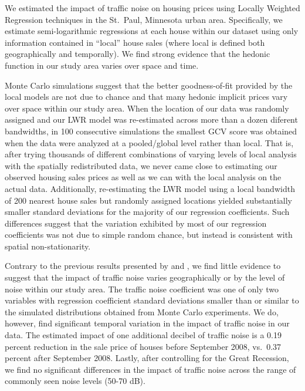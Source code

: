 \documentclass{article}\usepackage{graphicx, color}
\begin{document}
We estimated the impact of traffic noise on housing prices using Locally Weighted Regression techniques in the St.\ Paul, Minnesota urban area. Specifically, we estimate semi-logarithmic regressions at each house within our dataset using only information contained in ``local'' house sales (where local is defined both geographically and temporally). We find strong evidence that the hedonic function in our study area varies over space and time. 

Monte Carlo simulations suggest that the better goodness-of-fit provided by the local models are not due to chance and that many hedonic implicit prices vary over space within our study area. When the location of our data was randomly assigned and our LWR model was re-estimated across more than a dozen diferent bandwidths, in 100 consecutive simulations the smallest GCV score was obtained when the data were analyzed at a pooled/global level rather than local. That is, after trying thousands of different combinations of varying levels of local analysis with the spatially redistributed data, we never came close to estimating our observed housing sales prices as well as we can with the local analysis on the actual data. Additionally, re-estimating the LWR model using a local bandwidth of 200 nearest house sales but randomly assigned locations yielded substantially smaller standard deviations for the majority of our regression coefficients. Such differences suggest that the variation exhibited by most of our regression coefficients was not due to simple random chance, but instead is consistent with spatial non-stationarity. 

Contrary to the previous results presented by \citet{MarmolejoDuarteCarlos;GonzalezTamez2009} and \citet{Theebe2004a}, we find little evidence to suggest that the impact of traffic noise varies geographically or by the level of noise within our study area. The traffic noise coefficient was one of only two variables with regression coefficient standard deviations smaller than or similar to the simulated distributions obtained from Monte Carlo experiments. We do, however, find significant temporal variation in the impact of traffic noise in our data. The estimated impact of one additional decibel of traffic noise is a 0.19 percent reduction in the sale price of houses before September 2008, vs.\ 0.37 percent after September 2008. Lastly, after controlling for the Great Recession, we find no significant differences in the impact of traffic noise across the range of commonly seen noise levels (50-70 dB).
\end{document}
